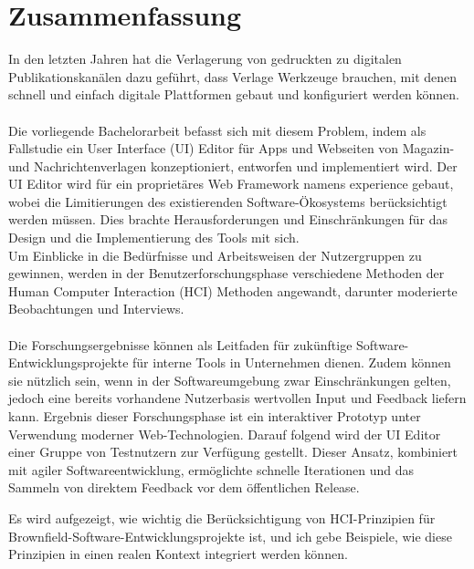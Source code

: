 %

\chapter*{Zusammenfassung}

In den letzten Jahren hat die Verlagerung von gedruckten zu digitalen Publikationskanälen dazu geführt, dass Verlage Werkzeuge brauchen, mit denen schnell und einfach digitale Plattformen gebaut und konfiguriert werden können.
\\\\
Die vorliegende Bachelorarbeit befasst sich mit diesem Problem, indem als Fallstudie ein User Interface (UI) Editor für Apps und Webseiten von Magazin- und Nachrichtenverlagen konzeptioniert, entworfen und implementiert wird.
Der UI Editor wird für ein proprietäres Web Framework namens \Gls{experience} gebaut, wobei die Limitierungen des existierenden Software-Ökosystems berücksichtigt werden müssen.
Dies brachte Herausforderungen und Einschränkungen für das Design und die Implementierung des Tools mit sich.
\\
Um Einblicke in die Bedürfnisse und Arbeitsweisen der Nutzergruppen zu gewinnen, werden in der Benutzerforschungsphase verschiedene Methoden der Human Computer Interaction (HCI)
Methoden angewandt, darunter moderierte Beobachtungen und Interviews.
\\\\
Die Forschungsergebnisse können als Leitfaden für zukünftige Software-\\Entwicklungsprojekte für interne Tools in Unternehmen dienen.
Zudem können sie nützlich sein, wenn in der Softwareumgebung zwar Einschränkungen gelten, jedoch eine bereits vorhandene Nutzerbasis wertvollen Input und Feedback liefern kann.
Ergebnis dieser Forschungsphase ist ein interaktiver Prototyp unter Verwendung moderner Web-Technologien. Darauf folgend wird der UI Editor einer Gruppe von Testnutzern zur Verfügung gestellt.
Dieser Ansatz, kombiniert mit agiler Softwareentwicklung, ermöglichte schnelle Iterationen und das Sammeln von direktem Feedback vor dem öffentlichen Release.

Es wird aufgezeigt, wie wichtig die Berücksichtigung von HCI-Prinzipien für Brownfield-Software-Entwicklungsprojekte ist, und ich gebe Beispiele, wie diese Prinzipien in einen realen Kontext integriert werden können.